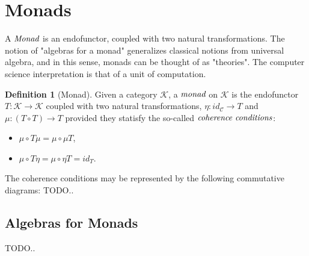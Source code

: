 \documentclass[10pt, oneside, reqno]{amsart}
\theoremstyle{plain}%
\theoremstyle{definition}
\newtheorem{defn}[thm]{Definition}
\theoremstyle{remark}
\newcommand{\Id}{\mathit{id}_}
\begin{document}
\section{Monads} %
\label{sec:monads}
A $\emph{Monad}$ is an endofunctor, coupled with two natural transformations.
The notion of "algebras for a monad" generalizes classical notions from universal algebra, and in this sense, monads can be thought of as "theories".
The computer science interpretation is that of a unit of computation.

\begin{defn}[Monad]
 Given a category $\mathcal{K}$, a $\emph{monad}$ on $\mathcal{K}$ is the endofunctor $T: \mathcal{K} \to \mathcal{K}$
 coupled with two natural transformations, $\eta: \Id{\mathcal{C}} \to T$ and $\mu: (T \circ T) \to T$ provided they
 statisfy the so-called $\emph{coherence conditions}$:
 \begin{itemize}
  \item $\mu \circ T \mu = \mu \circ \mu T$,
  \item $\mu \circ T \eta = \mu \circ \eta T = \Id{T}$.
 \end{itemize}
\end{defn}
The coherence conditions may be represented by the following commutative diagrams:
TODO..

\subsection{Algebras for Monads} %
\label{sec:monadalgebra}
TODO..
\end{document}
